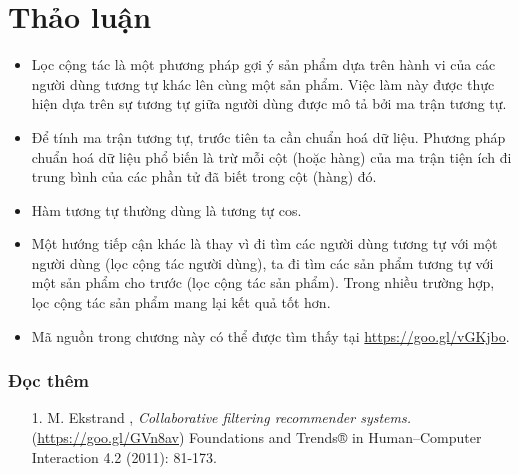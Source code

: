 \section{Thảo luận}
\label{sec:24_discuss}
\begin{itemize}
\item Lọc cộng tác là một phương pháp gợi ý sản phẩm dựa trên hành vi của các người dùng tương tự khác lên cùng một
sản phẩm. Việc làm này được thực hiện dựa trên sự tương tự giữa người dùng được mô tả bởi ma trận tương tự.

\item Để tính ma trận tương tự, trước tiên ta cần chuẩn hoá dữ
liệu. Phương pháp chuẩn hoá dữ liệu phổ biến là trừ mỗi cột (hoặc hàng) của ma trận tiện ích đi trung bình của các phần tử đã biết trong cột (hàng) đó.

\item Hàm tương tự thường dùng là tương tự cos.

\item Một hướng tiếp cận khác là thay vì đi tìm các người dùng tương tự với một người dùng (lọc cộng tác người dùng), ta đi tìm các sản phẩm tương tự
với một sản phẩm cho trước (lọc cộng tác sản phẩm). Trong nhiều trường hợp, lọc cộng tác sản phẩm mang lại kết quả tốt hơn.


\item Mã nguồn trong chương này có thể được tìm thấy tại \url{https://goo.gl/vGKjbo}.
\end{itemize}


\subsubsection{Đọc thêm}
\begin{enumerate}
\item[1.] M. Ekstrand \etal, \textit{Collaborative filtering recommender systems.}
(\url{https://goo.gl/GVn8av}) Foundations and Trends® in Human–Computer Interaction 4.2 (2011): 81-173.
\end{enumerate}

